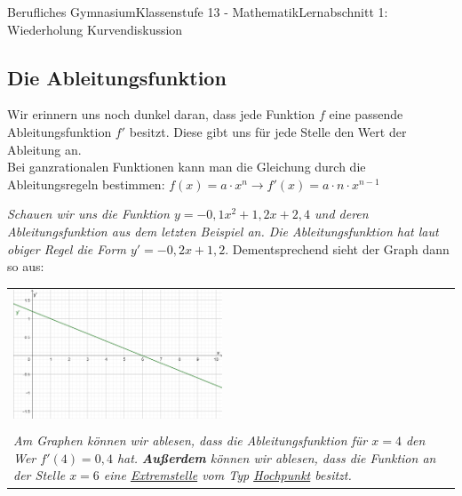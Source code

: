 \documentclass[11pt,twocolumn,oneside,openany,headings=optiontotoc,11pt,numbers=noenddot]{article}
\begin{document}
\begin{worksheet}{Berufliches Gymnasium}{Klassenstufe 13 - Mathematik}{Lernabschnitt 1: Wiederholung Kurvendiskussion}
		\subsection{Die Ableitungsfunktion}
		Wir erinnern uns noch dunkel daran, dass jede Funktion \(f\) eine passende Ableitungsfunktion \(f'\) besitzt. Diese gibt uns für jede Stelle den Wert der Ableitung an.\\
		Bei ganzrationalen Funktionen kann man die Gleichung durch die Ableitungsregeln bestimmen: \(f(x) = a\cdot{}x^n\rightarrow{}f'(x) = a\cdot{}n\cdot{}x^{n-1}\)\\
		\par\bigskip\noindent
		\textit{Schauen wir uns die Funktion \(y = -0,1x^2 + 1,2x +2,4\) und deren Ableitungsfunktion aus dem letzten Beispiel an. Die Ableitungsfunktion hat laut obiger Regel die Form \(y' = -0,2x + 1,2\)}. Dementsprechend sieht der Graph dann so aus:\\
		\par\bigskip\noindent
		\begin{tabularx}{0.5\textwidth}{X}
			\includegraphics[width=0.48\textwidth]{../99_Bilder/00_Wdh/KiTa'.png}\\
			\\
			\textit{Am Graphen können wir ablesen, dass die Ableitungsfunktion für \(x=4\) den Wer \(f'(4)=0,4\) hat.}
			\textit{\textbf{Außerdem} können wir ablesen, dass die Funktion an der Stelle \(x=6\) eine \underline{Extremstelle} vom Typ \underline{Hochpunkt} besitzt.}
		\end{tabularx}

\end{worksheet}
\end{document}
